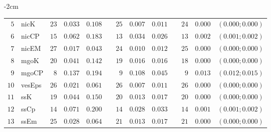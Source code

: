 \begin{table*}[!htbp]
\begin{adjustwidth*}{}{-2cm}
\begin{tabular}{@{}rlrrrrrrrrrcc@{}}
\footnotesize{$5 $} & \footnotesize{nicK     } & \footnotesize{$23$} & \footnotesize{$0.033$} & \footnotesize{$0.108$} && \footnotesize{$25$} & \footnotesize{$0.007$} & \footnotesize{$0.011$} && \footnotesize{$24$} & \footnotesize{$0.000$} & \footnotesize{$(0.000;0.000)$} \\
\footnotesize{$6 $} & \footnotesize{nicCP    } & \footnotesize{$15$} & \footnotesize{$0.062$} & \footnotesize{$0.183$} && \footnotesize{$13$} & \footnotesize{$0.034$} & \footnotesize{$0.026$} && \footnotesize{$13$} & \footnotesize{$0.002$} & \footnotesize{$(0.001;0.002)$} \\
\footnotesize{$7 $} & \footnotesize{nicEM    } & \footnotesize{$27$} & \footnotesize{$0.017$} & \footnotesize{$0.043$} && \footnotesize{$24$} & \footnotesize{$0.010$} & \footnotesize{$0.012$} && \footnotesize{$25$} & \footnotesize{$0.000$} & \footnotesize{$(0.000;0.000)$} \\
\footnotesize{$8 $} & \footnotesize{mgoK     } & \footnotesize{$20$} & \footnotesize{$0.041$} & \footnotesize{$0.142$} && \footnotesize{$19$} & \footnotesize{$0.016$} & \footnotesize{$0.016$} && \footnotesize{$18$} & \footnotesize{$0.000$} & \footnotesize{$(0.000;0.000)$} \\
\footnotesize{$9 $} & \footnotesize{mgoCP    } & \footnotesize{$8 $} & \footnotesize{$0.137$} & \footnotesize{$0.194$} && \footnotesize{$9 $} & \footnotesize{$0.108$} & \footnotesize{$0.045$} && \footnotesize{$9 $} & \footnotesize{$0.013$} & \footnotesize{$(0.012;0.015)$} \\
\footnotesize{$10$} & \footnotesize{vesEps   } & \footnotesize{$26$} & \footnotesize{$0.021$} & \footnotesize{$0.061$} && \footnotesize{$26$} & \footnotesize{$0.007$} & \footnotesize{$0.011$} && \footnotesize{$26$} & \footnotesize{$0.000$} & \footnotesize{$(0.000;0.000)$} \\
\footnotesize{$11$} & \footnotesize{ssK      } & \footnotesize{$19$} & \footnotesize{$0.044$} & \footnotesize{$0.150$} && \footnotesize{$20$} & \footnotesize{$0.013$} & \footnotesize{$0.017$} && \footnotesize{$20$} & \footnotesize{$0.000$} & \footnotesize{$(0.000;0.000)$} \\
\footnotesize{$12$} & \footnotesize{ssCp     } & \footnotesize{$14$} & \footnotesize{$0.071$} & \footnotesize{$0.200$} && \footnotesize{$14$} & \footnotesize{$0.028$} & \footnotesize{$0.033$} && \footnotesize{$14$} & \footnotesize{$0.001$} & \footnotesize{$(0.001;0.002)$} \\
\footnotesize{$13$} & \footnotesize{ssEm     } & \footnotesize{$25$} & \footnotesize{$0.028$} & \footnotesize{$0.064$} && \footnotesize{$21$} & \footnotesize{$0.013$} & \footnotesize{$0.017$} && \footnotesize{$21$} & \footnotesize{$0.000$} & \footnotesize{$(0.000;0.000)$} \\

\end{tabular}
\end{adjustwidth*}
\end{table*}
